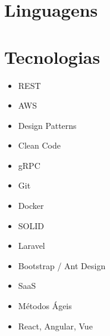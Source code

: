 \documentclass[a4paper]{curriculo}
\begin{document}
\begin{minipage}[t]{0.45\textwidth}
    \vspace{-\baselineskip}
	\section{Linguagens}
	\vspace{-1.2em}
	\begin{barchart}{3}
	\end{barchart}
\end{minipage}
\hfill %
\begin{minipage}[t]{0.55\textwidth}
    \vspace{-\baselineskip}
	\section{Tecnologias}
		\begin{minipage}[t]{0.45\textwidth}
			\begin{itemize}[itemsep=0.01em,topsep=0pt,leftmargin=*]
				\item REST
				\item AWS
				\item Design Patterns
				\item Clean Code
				\item gRPC
				\item Git
				\item Docker
			\end{itemize}
		\end{minipage}
		\begin{minipage}[t]{0.45\textwidth}
			\begin{itemize}[itemsep=0.01em,topsep=0pt,leftmargin=*]
				\item SOLID
				\item Laravel
				\item Bootstrap / Ant Design
				\item SaaS
				\item Métodos Ágeis
				\item React, Angular, Vue
			\end{itemize}
	\end{minipage}
\end{minipage}

\end{document}
